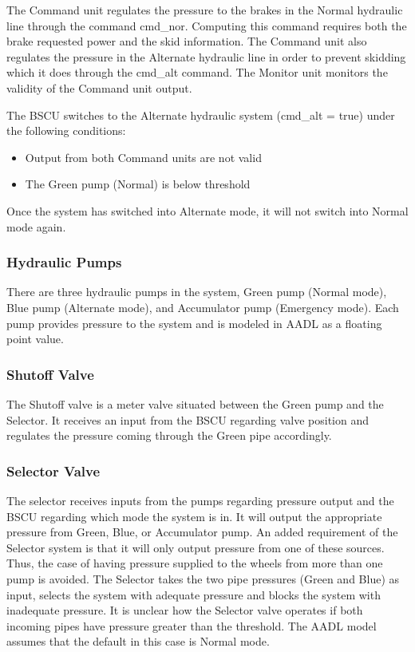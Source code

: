 The Command unit regulates the pressure to the brakes in the Normal hydraulic line through the command cmd\_nor. Computing this command requires both the brake requested power and the skid information. The Command unit also regulates the pressure in the Alternate hydraulic line in order to prevent skidding which it does through the cmd\_alt command. The Monitor unit monitors the validity of the Command unit output. 

The BSCU switches to the Alternate hydraulic system (cmd\_alt = true) under the following conditions:
\begin{itemize}
\item Output from both Command units are not valid
\item The Green pump (Normal) is below threshold
\end{itemize}

Once the system has switched into Alternate mode, it will not switch into Normal mode again. 

\subsubsection{Hydraulic Pumps}
There are three hydraulic pumps in the system, Green pump (Normal mode), Blue pump (Alternate mode), and Accumulator pump (Emergency mode). Each pump provides pressure to the system and is modeled in AADL as a floating point value. 

\subsubsection{Shutoff Valve}

The Shutoff valve is a meter valve situated between the Green pump and the Selector. It receives an input from the BSCU regarding valve position and regulates the pressure coming through the Green pipe accordingly.  

\subsubsection{Selector Valve}
The selector receives inputs from the pumps regarding pressure output and the BSCU regarding which mode the system is in. It will output the appropriate pressure from Green, Blue, or Accumulator pump. An added requirement of the Selector system is that it will only output pressure from one of these sources. Thus, the case of having pressure supplied to the wheels from more than one pump is avoided. The Selector takes the two pipe pressures (Green and Blue) as input, selects the system with adequate pressure and blocks the system with inadequate pressure. It is unclear how the Selector valve operates if both incoming pipes have pressure greater than the threshold. The AADL model assumes that the default in this case is Normal mode. 

